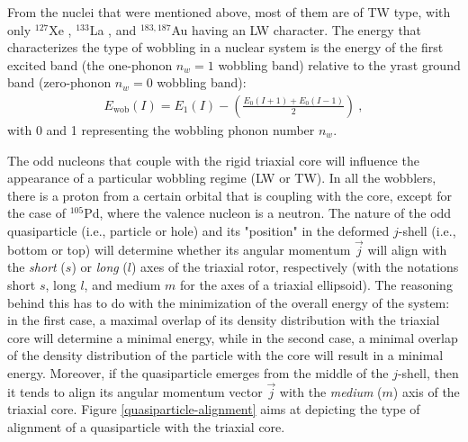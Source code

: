 \documentclass[11pt]{article}
\begin{document}
From the nuclei that were mentioned above, most of them are of TW type, with only $^{127}$Xe \cite{chakraborty2020multiphonon}, $^{133}$La \cite{biswas2019longitudinal}, and $^{183,187}$Au \cite{nandi2020first,sensharma2020longitudinal} having an LW character. The energy that characterizes the type of wobbling in a nuclear system is the energy of the first excited band (the one-phonon $n_w=1$ wobbling band) relative to the yrast ground band (zero-phonon $n_w=0$ wobbling band):
\begin{align}
    E_\text{wob}(I)=E_{1}(I)-\left(\frac{E_0(I+1)+E_0(I-1)}{2}\right)\ ,
    \label{wobbling-energy-relative}
\end{align}
with 0 and 1 representing the wobbling phonon number $n_w$.

The odd nucleons that couple with the rigid triaxial core will influence the appearance of a particular wobbling regime (LW or TW). In all the wobblers, there is a proton from a certain orbital that is coupling with the core, except for the case of $^{105}$Pd, where the valence nucleon is a neutron. The nature of the odd quasiparticle (i.e., particle or hole) and its "position" in the deformed $j$-shell (i.e., bottom or top) will determine whether its angular momentum $\vec{j}$ will align with the \emph{short} ($s$) or \emph{long} ($l$) axes of the triaxial rotor, respectively (with the notations short $s$, long $l$, and medium $m$ for the axes of a triaxial ellipsoid). The reasoning behind this has to do with the minimization of the overall energy of the system: in the first case, a maximal overlap of its density distribution with the triaxial core will determine a minimal energy, while in the second case, a minimal overlap of the density distribution of the particle with the core will result in a minimal energy. Moreover, if the quasiparticle emerges from the middle of the $j$-shell, then it tends to align its angular momentum vector $\vec{j}$ with the \emph{medium} ($m$) axis of the triaxial core. Figure \ref{quasiparticle-alignment} aims at depicting the type of alignment of a quasiparticle with the triaxial core.
\end{document}
